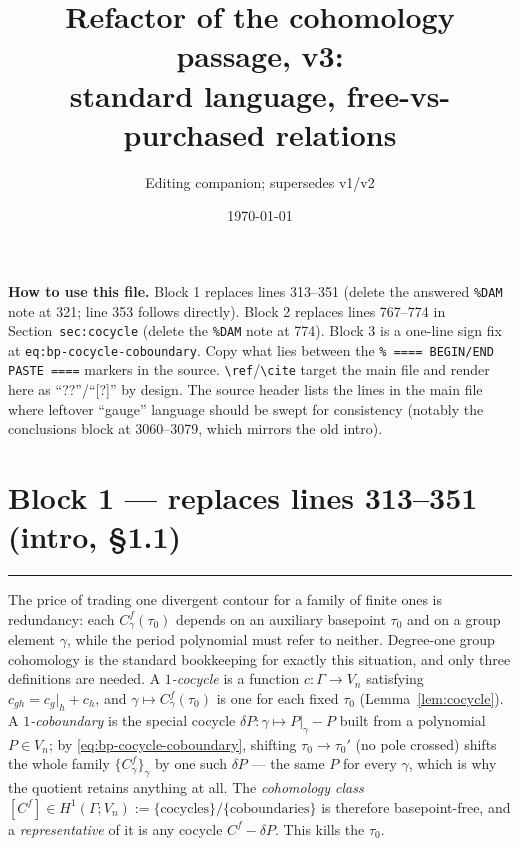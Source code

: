 \documentclass[11pt]{article}
\title{\bf Refactor of the cohomology passage, v3:\\ standard language,
free-vs-purchased relations}
\author{Editing companion; supersedes v1/v2}
\date{\today}
\newcommand{\blockrule}{\par\noindent\rule{\textwidth}{0.8pt}\par}
\begin{document}
\maketitle

\noindent\textbf{How to use this file.}
Block 1 replaces lines 313--351 (delete the answered \texttt{\%DAM} note
at 321; line 353 follows directly).  Block 2 replaces lines 767--774 in
Section~\texttt{sec:cocycle} (delete the \texttt{\%DAM} note at 774).
Block 3 is a one-line sign fix at \texttt{eq:bp-cocycle-coboundary}.
Copy what lies between the \verb|% ==== BEGIN/END PASTE ====| markers in
the source.  \verb|\ref|/\verb|\cite| target the main file and render
here as ``??''/``[?]'' by design.  The source header lists the lines in
the main file where leftover ``gauge'' language should be swept for
consistency (notably the conclusions block at 3060--3079, which mirrors
the old intro).

\section*{Block 1 --- replaces lines 313--351 (intro, \S1.1)}
\blockrule


The price of trading one divergent contour for a family of finite ones
is redundancy: each $C^f_\gamma(\tau_0)$ depends on an auxiliary
basepoint $\tau_0$ and on a group element $\gamma$, while the period
polynomial must refer to neither.  Degree-one group cohomology is the
standard bookkeeping for exactly this situation, and only three
definitions are needed.  A \emph{$1$-cocycle} is a function
$c\colon \Gamma \to V_n$ satisfying $c_{gh} = c_g|_h + c_h$, and
$\gamma \mapsto C^f_\gamma(\tau_0)$ is one for each fixed $\tau_0$
(Lemma~\ref{lem:cocycle}).  A \emph{$1$-coboundary} is the special
cocycle $\delta P\colon \gamma \mapsto P|_\gamma - P$ built from a
polynomial $P \in V_n$; by \eqref{eq:bp-cocycle-coboundary}, shifting
$\tau_0 \to \tau_0'$ (no pole crossed) shifts the whole family
$\{C^f_\gamma\}_\gamma$ by one such $\delta P$ --- the same $P$ for
every $\gamma$, which is why the quotient retains anything at all.  The
\emph{cohomology class}
$[C^f] \in H^1(\Gamma; V_n) :=
\{\text{cocycles}\}/\{\text{coboundaries}\}$ is therefore
basepoint-free, and a \emph{representative} of it is any cocycle
$C^f - \delta P$.  This kills the
$\tau_0$. %
\end{document}
